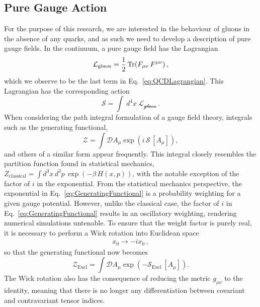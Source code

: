 \subsection{Pure Gauge Action}
For the purpose of this research, we are interested in the behaviour of gluons in the absence of any quarks, and as such we need to develop a description of pure gauge fields. In the continuum, a pure gauge field has the Lagrangian~\cite{ryder1996quantum}
%
\begin{equation}
\mathcal{L}_{\text{gluon}}=\frac{1}{2}\operatorname{Tr}(F_{\mu\nu}\,F^{\mu\nu})\, ,
\label{eq:GaugeLagrangian}
\end{equation}
%
which we observe to be the last term in Eq.~\ref{eq:QCDLagrangian}. This Lagrangian has the corresponding action
%
\begin{equation}
\mathcal{S}=\int~d^4x~\mathcal{L_\text{gluon}}\, .
\label{eq:QCDAction}
\end{equation}
%
When considering the path integral formulation of a gauge field theory, integrals such as the generating functional,
%
\begin{equation}
\mathcal{Z} =\int \mathcal{D} A_\mu \exp\left(i\,\mathcal{S}\,[A_\mu]\right),
\label{eq:GeneratingFunctional}
\end{equation}
%
and others of a similar form appear frequently. This integral closely resembles the partition function found in statistical mechanics, $Z_{\text{classical}}=\int d^3x\,d^3p\,\exp\left(-\beta\,H(x,p)\right)$, with the notable exception of the factor of $i$ in the exponential. From the statistical mechanics perspective, the exponential in Eq.~\ref{eq:GeneratingFunctional} is a probability weighting for a given gauge potential. However, unlike the classical case, the factor of $i$ in Eq.~\ref{eq:GeneratingFunctional} results in an oscillatory weighting, rendering numerical simulations untenable. To ensure that the weight factor is purely real, it is necessary to perform a Wick rotation into Euclidean space~\cite{Schafer:1996wv,Wilson:1974sk}
%
\begin{align*}
x_0\rightarrow -ix_0\, ,
\end{align*}
%
so that the generating functional now becomes 
%
\begin{equation}
\mathcal{Z}_{\text{Eucl}} =\int \mathcal{D} A_\mu \exp\left(-\mathcal{S}_{\text{Eucl}}\,[A_\mu]\right).
\end{equation}
%
The Wick rotation also has the consequence of reducing the metric $g_{\mu\nu}$ to the identity, meaning that there is no longer any differentiation between covariant and contravariant tensor indices.\\

